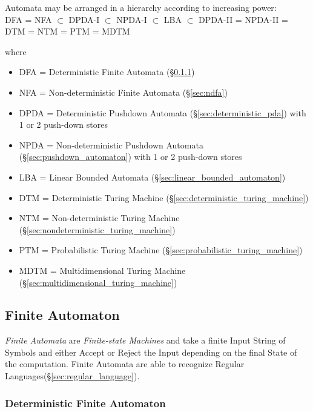 Automata may be arranged in a hierarchy according to increasing
power:\\
DFA = NFA $\subset$ DPDA-I $\subset$ NPDA-I $\subset$ LBA
$\subset$ DPDA-II = NPDA-II = DTM = NTM = PTM = MDTM

where
\begin{itemize}
\item DFA = Deterministic Finite Automata (\S\ref{sec:dfa})
\item NFA = Non-deterministic Finite Automata (\S\ref{sec:ndfa})
\item DPDA = Deterministic Pushdown Automata
  (\S\ref{sec:deterministic_pda}) with 1 or 2 push-down stores
\item NPDA = Non-deterministic Pushdown Automata
  (\S\ref{sec:pushdown_automaton}) with 1 or 2 push-down stores
\item LBA = Linear Bounded Automata
  (\S\ref{sec:linear_bounded_automaton})
\item DTM = Deterministic Turing Machine
  (\S\ref{sec:deterministic_turing_machine})
\item NTM = Non-deterministic Turing Machine
  (\S\ref{sec:nondeterministic_turing_machine})
\item PTM = Probabilistic Turing Machine
  (\S\ref{sec:probabilistic_turing_machine})
\item MDTM = Multidimensional Turing Machine
  (\S\ref{sec:multidimensional_turing_machine})
\end{itemize}



\subsection{Finite Automaton}\label{sec:finite_automaton}

\emph{Finite Automata} are \emph{Finite-state Machines} and take a
finite Input String of Symbols and either Accept or Reject the Input
depending on the final State of the computation. Finite Automata are
able to recognize Regular Languages(\S\ref{sec:regular_language}).



\subsubsection{Deterministic Finite Automaton}\label{sec:dfa}

